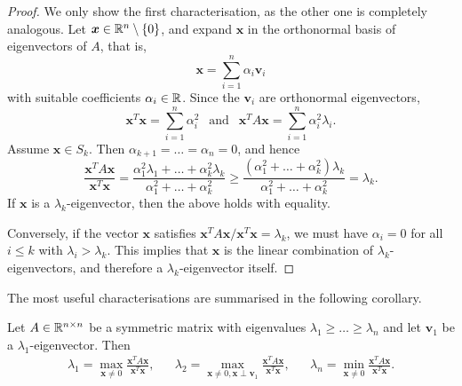 \begin{proof}
    We only show the first characterisation, as the other one is completely analogous.
    Let $\bm{x} \in \mathbb{R}^n \setminus \{ 0 \}$, and expand $\bm{x}$ in the orthonormal basis of eigenvectors of $A$, that is,
    \begin{equation*}
        \bm x = \sum_{i = 1}^n \alpha_i \bm{v}_i
    \end{equation*}
    with suitable coefficients $\alpha_i \in \mathbb{R}$. Since the $\bm{v}_i$ are orthonormal eigenvectors, 
    \begin{equation*}
        \bm{x}^T \bm{x} = \sum_{i = 1}^n \alpha_i^2 \ \ \text{ and } \ \ \bm{x}^T A \bm{x} = \sum_{i = 1}^n \alpha_i^2 \lambda_i.
    \end{equation*}
    Assume $\bm{x} \in S_k$. 
    Then $\alpha_{k + 1} = \dots = \alpha_n = 0$, and hence
    \begin{equation*}
        \frac{\bm{x}^T A \bm{x}}{\bm{x}^T \bm{x}} = \frac{\alpha_1^2 \lambda_1 + \dots + \alpha_k ^2 \lambda_k}{\alpha_1^2 + \dots + \alpha_k ^2}
            \ge \frac{(\alpha_1^2 + \dots + \alpha_k ^2) \lambda_k}{\alpha_1^2 + \dots + \alpha_k ^2} = \lambda_k.
    \end{equation*}
    If $\bm{x}$ is a $\lambda_k$-eigenvector, then the above holds with equality.
    
    Conversely, if the vector $\bm{x}$ satisfies $\bm{x}^T A \bm{x} / \bm{x}^T \bm{x} = \lambda_k$, we must have $\alpha_i = 0$ for all $i \le k$ with $\lambda_i > \lambda_k$.
    This implies that $\bm{x}$ is the linear combination of $\lambda_k$-eigenvectors, and therefore a $\lambda_k$-eigenvector itself.
\end{proof}

The most useful characterisations are summarised in the following corollary.
\begin{corollary} \label{cor:rayleigh-quotients}
    Let $A \in \mathbb{R}^{n \times n}$ be a symmetric matrix with eigenvalues $\lambda_1 \ge \dots \ge \lambda_n$ and let $\bm{v}_1$ be a $\lambda_1$-eigenvector. Then
    \begin{align*}
        \lambda_1 = \max \limits_{\bm{x} \ne 0} \frac{\bm{x}^T A \bm{x}}{\bm{x}^T \bm{x}}, &&
        \lambda_2 = \max \limits_{\bm{x} \ne 0, \bm{x} \perp \bm{v}_1} \frac{\bm{x}^T A \bm{x}}{\bm{x}^T \bm{x}}, &&
        \lambda_n = \min \limits_{\bm{x} \ne 0} \frac{\bm{x}^T A \bm{x}}{\bm{x}^T \bm{x}}.
    \end{align*}
\end{corollary}



